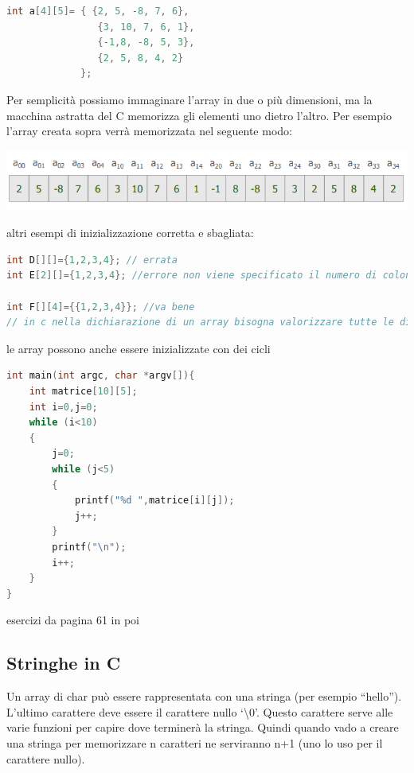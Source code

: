 \documentclass[
  paper=a4,
  oneside  ,captions=tableheading
]{scrbook}
\begin{document}
\begin{lstlisting}[language={C++}]
int a[4][5]= { {2, 5, -8, 7, 6},
                {3, 10, 7, 6, 1},
                {-1,8, -8, 5, 3},
                {2, 5, 8, 4, 2}
             };
\end{lstlisting}

Per semplicità possiamo immaginare l'array in due o più dimensioni, ma
la macchina astratta del C memorizza gli elementi uno dietro l'altro.
Per esempio l'array creata sopra verrà memorizzata nel seguente modo:

\includegraphics{./image/image-20201208150630550.png}

altri esempi di inizializzazione corretta e sbagliata:

\begin{lstlisting}[language={C++}]
int D[][]={1,2,3,4}; // errata
int E[2][]={1,2,3,4}; //errore non viene specificato il numero di colonne

int F[][4]={{1,2,3,4}}; //va bene 
// in c nella dichiarazione di un array bisogna valorizzare tutte le dimensioni, si può fare a meno di quella più a sinistra 
\end{lstlisting}

le array possono anche essere inizializzate con dei cicli

\begin{lstlisting}[language={C++}]
int main(int argc, char *argv[]){
    int matrice[10][5];
    int i=0,j=0;
    while (i<10)
    {
        j=0;
        while (j<5)
        {
            printf("%d ",matrice[i][j]);
            j++;
        }
        printf("\n");
        i++;
    }
}
\end{lstlisting}

esercizi da pagina 61 in poi

\hypertarget{stringhe-in-c}{%
\subsection{Stringhe in C}\label{stringhe-in-c}}

Un array di char può essere rappresentata con una stringa (per esempio
``hello''). L'ultimo carattere deve essere il carattere nullo
`\textbackslash0'. Questo carattere serve alle varie funzioni per capire
dove terminerà la stringa. Quindi quando vado a creare una stringa per
memorizzare n caratteri ne serviranno n+1 (uno lo uso per il carattere
nullo).
\end{document}
